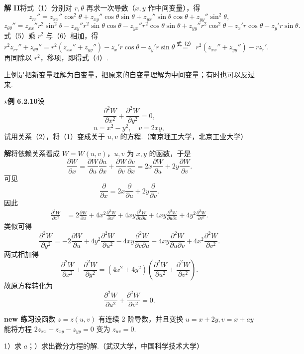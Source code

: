 \documentclass[UTF8,12pt,a4paper,fontset=fandol]{ctexart}
\begin{document}
\noindent\textbf{解 II}\quad 将式（1）分别对 $r,\theta$ 再求一次导数（$x,y$ 作中间变量），得
\[
  z_{rr}''=z_{xx}''\cos^2\theta+z_{xy}''\cos\theta\sin\theta+z_{yx}''\sin\theta\cos\theta+z_{yy}''\sin^2\theta, \tag{5}
\]
\[
  z_{\theta\theta}''=z_{xx}''r^2\sin^2\theta-z_{xy}''r^2\sin\theta\cos\theta
  -z_{yx}''r^2\cos\theta\sin\theta+z_{yy}''r^2\cos^2\theta-z_x'r\cos\theta-z_y'r\sin\theta. \tag{6}
\]
式（5）乘 $r^2$ 与（6）相加，得
\[
  r^2z_{rr}''+z_{\theta\theta}''
  =r^2(z_{xx}''+z_{yy}'')-z_x'r\cos\theta-z_y'r\sin\theta
  \stackrel{\text{式（2）}}{=}r^2(z_{xx}''+z_{yy}'')-rz_r'.
\]
再同除以 $r^2$，移项，即得式（4）.

上例是把新变量理解为自变量，把原来的自变量理解为中间变量；有时也可以反过来.

\noindent\textbf{\ensuremath{\star}例 6.2.10}\quad 设
\[
  \frac{\partial^2W}{\partial x^2}+\frac{\partial^2W}{\partial y^2}=0, \tag{1}
\]
\[
  u=x^2-y^2,\quad v=2xy, \tag{2}
\]
试用关系（2），将（1）变成关于 $u,v$ 的方程.（南京理工大学，北京工业大学）

\noindent\textbf{解}\quad 将依赖关系看成 $W=W(u,v)$，$u,v$ 为 $x,y$ 的函数，于是
\[
  \frac{\partial W}{\partial x}
  =\frac{\partial W}{\partial u}\frac{\partial u}{\partial x}
  +\frac{\partial W}{\partial v}\frac{\partial v}{\partial x}
  =2x\frac{\partial W}{\partial u}+2y\frac{\partial W}{\partial v}.
\]
可见
\[
  \frac{\partial}{\partial x}=2x\frac{\partial}{\partial u}+2y\frac{\partial}{\partial v}.
\]
因此
\[
\begin{aligned}
\frac{\partial^2W}{\partial x^2}
&=2\frac{\partial W}{\partial u}+4x^2\frac{\partial^2W}{\partial u^2}
+4xy\frac{\partial^2W}{\partial v\partial u}
+4xy\frac{\partial^2W}{\partial u\partial v}
+4y^2\frac{\partial^2W}{\partial v^2}.
\end{aligned}
\]
类似可得
\[
  \frac{\partial^2W}{\partial y^2}
  =-2\frac{\partial W}{\partial u}+4y^2\frac{\partial^2W}{\partial u^2}
  -4xy\frac{\partial^2W}{\partial v\partial u}
  -4xy\frac{\partial^2W}{\partial u\partial v}
  +4x^2\frac{\partial^2W}{\partial v^2}.
\]
两式相加得
\[
  \frac{\partial^2W}{\partial x^2}+\frac{\partial^2W}{\partial y^2}
  =(4x^2+4y^2)\left(\frac{\partial^2W}{\partial u^2}+\frac{\partial^2W}{\partial v^2}\right).
\]
故原方程转化为
\[
  \frac{\partial^2W}{\partial u^2}+\frac{\partial^2W}{\partial v^2}=0.
\]

\noindent\textbf{new 练习}\quad 设函数 $z=z(u,v)$ 有连续 2 阶导数，并且变换 $u=x+2y,v=x+ay$ 能将方程 $2z_{xx}+z_{xy}-z_{yy}=0$ 变为 $z_{uv}=0$.

1）求 $a$；）求出微分方程的解.（武汉大学，中国科学技术大学）
\end{document}
